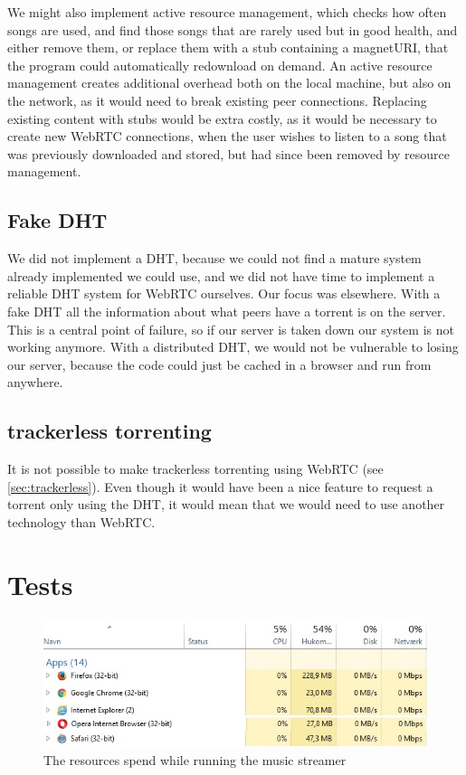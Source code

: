 We might also implement active resource management, which checks how often songs are used,
and find those songs that are rarely used but in good health, and either remove them,
or replace them with a stub containing a magnetURI, 
that the program could automatically redownload on demand.
An active resource management creates additional overhead both on the local machine,
but also on the network, as it would need to break existing peer connections.
Replacing existing content with stubs would be extra costly,
as it would be necessary to create new WebRTC connections,
when the user wishes to listen to a song that was previously downloaded and stored,
but had since been removed by resource management.

\subsection{Fake \acs{DHT}}
We did not implement a DHT, 
because we could not find a mature system already implemented we could use, 
and we did not have time to implement a reliable DHT system for WebRTC ourselves.
Our focus was elsewhere.
With a fake \acs{DHT} all the information about what peers have a torrent is on the server. 
This is a central point of failure, so if our server is taken down our system is not working anymore.
With a distributed \acs{DHT}, 
we would not be vulnerable to losing our server, 
because the code could just be cached in a browser and run from anywhere.

\subsection{trackerless torrenting}
It is not possible to make trackerless torrenting using WebRTC (see \ref{sec:trackerless}). 
Even though it would have been a nice feature to request a torrent only using the \acs{DHT},
it would mean that we would need to use another technology than WebRTC.

\section{Tests}
\begin{figure}[H]
	\centering
	\includegraphics[width=\linewidth]{gfx/streamerIdle}
	\caption{The resources spend while running the music streamer}
	\label{fig:streamer-idle}
\end{figure}

